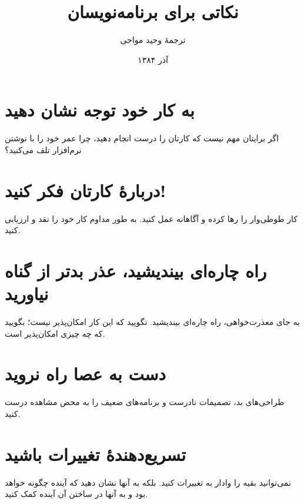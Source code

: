 \documentclass[10pt, a4paper]{book}
\begin{document}
    \title{نکاتی برای برنامه‌نویسان }
    \author{ترجمهٔ وحید مواجی}
    \date{آذر ۱۳۸۴}
    \frontmatter                            %
    \maketitle                              %
    \mainmatter

    \setcounter{section}{0}
    \renewcommand*\thesection{\arabic{section}}

    \section{به کار خود توجه نشان دهید}
    اگر برایتان مهم نیست که کارتان را درست انجام دهید، چرا عمر خود را با نوشتن نرم‌افزار تلف می‌کنید؟

    \section{دربارهٔ کارتان فکر کنید!}
    کار طوطی‌وار را رها کرده و آگاهانه عمل کنید. به طور مداوم کار خود را نقد و ارزیابی کنید.

    \section{راه چاره‌ای بیندیشید، عذر بدتر از گناه نیاورید}
    به جای معذرت‌خواهی، راه چاره‌ای بیندیشید. نگویید که این کار امکان‌پذیر نیست؛ بگویید که چه چیزی امکان‌پذیر است.

    \section{دست به عصا راه نروید}
    طراحی‌های بد، تصمیمات نادرست و برنامه‌های ضعیف را به محض مشاهده درست کنید.

    \section{تسریع‌دهندهٔ تغییرات باشید}
    نمی‌توانید بقیه را وادار به تغییرات کنید. بلکه به آنها نشان دهید که آینده چگونه خواهد بود و به آنها در ساختن آن آینده کمک کنید.
\end{document}
